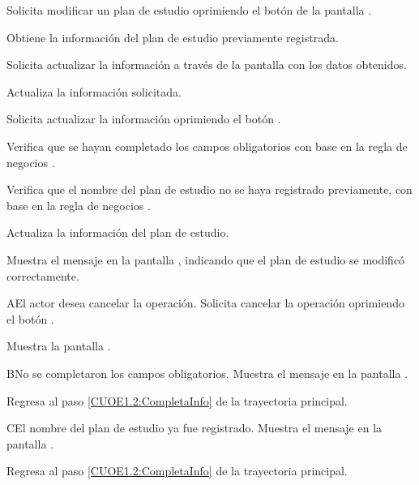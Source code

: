 \begin{UCtrayectoria}
	\UCpaso [\UCactor] Solicita modificar un plan de estudio oprimiendo el botón  de la pantalla . 
	
	\UCpaso [\UCsist] Obtiene la información del plan de estudio previamente registrada.
	
	\UCpaso [\UCsist] Solicita actualizar la información a través de la pantalla  con los datos obtenidos.
	
	\UCpaso [\UCactor] Actualiza la información solicitada. \label{CUOE1.2:CompletaInfo}
	
	\UCpaso [\UCactor] Solicita actualizar la información oprimiendo el botón . 
	
	\UCpaso [\UCsist] Verifica que se hayan completado los campos obligatorios con base en la regla de negocios . 
		
	\UCpaso [\UCsist] Verifica que el nombre del plan de estudio no se haya registrado previamente, con base en la regla de negocios . 
	
	\UCpaso [\UCsist] Actualiza la información del plan de estudio.
	
	\UCpaso [\UCsist] Muestra el mensaje  en la pantalla , indicando que el plan de estudio se modificó correctamente.	
	
\end{UCtrayectoria}

\begin{UCtrayectoriaA}{A}{El actor desea cancelar la operación.}
	\UCpaso [\UCactor] Solicita cancelar la operación oprimiendo el botón .
	
	\UCpaso [\UCsist] Muestra la pantalla . 
\end{UCtrayectoriaA}

\begin{UCtrayectoriaA}{B}{No se completaron los campos obligatorios.}
	\UCpaso [\UCsist] Muestra el mensaje  en la pantalla .
	
	\UCpaso Regresa al paso \ref{CUOE1.2:CompletaInfo} de la trayectoria principal.
\end{UCtrayectoriaA}

\begin{UCtrayectoriaA}{C}{El nombre del plan de estudio ya fue registrado.}
	\UCpaso [\UCsist] Muestra el mensaje  en la pantalla .
	
	\UCpaso Regresa al paso \ref{CUOE1.2:CompletaInfo} de la trayectoria principal.
\end{UCtrayectoriaA}

